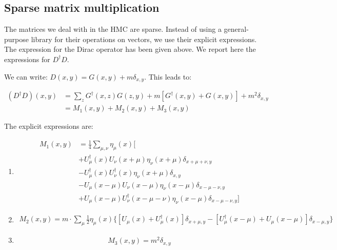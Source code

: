 \documentclass[12pt, a4paper]{article}
\begin{document}
  

\subsection{Sparse matrix multiplication}

The matrices we deal with in the HMC are sparse. 
Instead of using a general-purpose library for their operations on vectors, 
we use their explicit expressions. 
The expression for the Dirac operator has been given above. 
We report here the expressions for $D^{\dagger} D$.

We can write: $D(x,y) = G(x,y) + m \delta_{x,y}$. 
This leads to:

\begin{equation}
\begin{aligned}
(D^{\dagger} D) (x,y) 
&= 
\sum_{z} G^{\dagger}(x,z) G(z,y)
+ m [ G^{\dagger}(x,y) + G(x,y) ]
+ m^2 \delta_{x,y} 
\\
&= M_1(x,y) + M_2(x,y) + M_3(x,y)
\end{aligned}
\end{equation}

The explicit expressions are:

\begin{enumerate}
\item
\begin{equation}
\begin{aligned}
  M_1(x,y)
  &= 
  \frac{1}{4} \sum_{\mu, \nu} \eta_\mu(x)
  [ 
\\
  &+ U_\mu^{\dagger}(x) U_\nu(x+\mu) 
  \eta_{\nu}(x+\mu) \delta_{x+\mu+\nu, y}
   \\
  &- U_{\mu}^{\dagger}(x) U_{\nu}^{\dagger}(x) 
  \eta_{\nu}(x+\mu) \delta_{x,y}
  \\
  &- U_{\mu}(x-\mu) U_{\nu}(x-\mu) 
  \eta_{\nu}(x-\mu) \delta_{x-\mu-\nu,y}
   \\
  &+ U_{\mu}(x-\mu) U_{\nu}^{\dagger}(x-\mu-\nu) 
  \eta_{\nu}(x-\mu) \delta_{x-\mu-\nu,y}
  ]
\end{aligned}
\end{equation}

\item
\begin{equation}
\begin{aligned}
    M_2(x,y) 
    = m \cdot \sum_{\mu} \frac{1}{2} \eta_{\mu}(x) 
    \{
      [ U_{\mu}(x) + U_{\mu}^{\dagger}(x) ] 
      \delta_{x+\mu, y} -
      [ U^{\dagger}_{\mu}(x-\mu) + U_{\mu}(x-\mu) ] 
      \delta_{x-\mu, y}
    \}  
\end{aligned}
\end{equation}

\item
\begin{equation}
  M_3(x,y) = m^2 \delta_{x,y}
\end{equation}

\end{enumerate}
\end{document}
